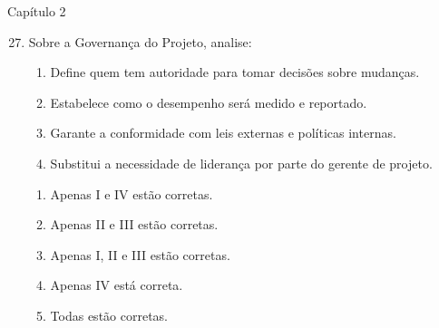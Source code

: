 \documentclass{beamer}
\begin{document}
\begin{frame}{Capítulo 2}
	\begin{enumerate}
		\setcounter{enumi}{26}
		\justifying
		\item Sobre a Governança do Projeto, analise:
		
		\begin{enumerate}[I]
			\item Define quem tem autoridade para tomar decisões sobre mudanças.
			\item Estabelece como o desempenho será medido e reportado.
			\item Garante a conformidade com leis externas e políticas internas.
			\item Substitui a necessidade de liderança por parte do gerente de projeto.
		\end{enumerate}
		
		\vspace{10pt}
		\begin{enumerate}[a]
			\item Apenas I e IV estão corretas.
			\item Apenas II e III estão corretas.
			\item \alert<2>{Apenas I, II e III estão corretas}.
			\item Apenas IV está correta.
			\item Todas estão corretas.
		\end{enumerate}
	\end{enumerate}
\end{frame}
\end{document}
